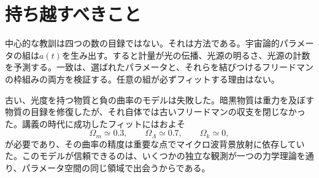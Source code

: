 \begin{classroomqa}
\end{classroomqa}

\begin{classroomqa}
\end{classroomqa}

\section{持ち越すべきこと}

中心的な教訓は四つの数の目録ではない。それは方法である。宇宙論的パラメータの組は\(a(t)\)を生み出す。すると計量が光の伝播、光源の明るさ、光源の計数を予測する。一致は、選ばれたパラメータと、それらを結びつけるフリードマンの枠組みの両方を検証する。任意の組が必ずフィットする理由はない。

古い、光度を持つ物質と負の曲率のモデルは失敗した。暗黒物質は重力を及ぼす物質の目録を修復したが、それ自体では古いフリードマンの収支を閉じなかった。講義の時代に成功したフィットにはおよそ
\begin{equation}
\Omega_m\simeq0.3,
\qquad
\Omega_\Lambda\simeq0.7,
\qquad
\Omega_k\simeq0,
\end{equation}
が必要であり、その曲率の精度は重要な点でマイクロ波背景放射に依存していた。このモデルが信頼できるのは、いくつかの独立な観測が一つの力学理論を通り、パラメータ空間の同じ領域で出会うからである。
